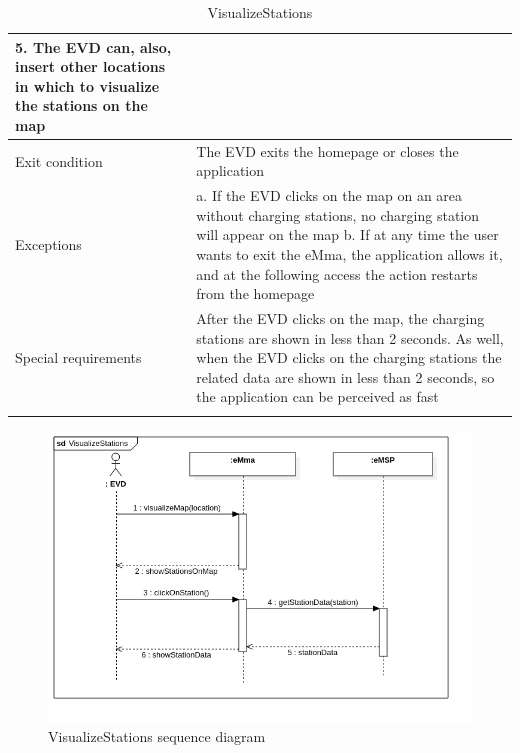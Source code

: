 \begin{center}
\begin{longtable}{p{4cm} p{11cm}}
                    5. The EVD can, also, insert other locations in which to visualize the stations on the map
     \\
     \hline
     Exit condition & The EVD exits the homepage or closes the application \\
     \hline
     Exceptions &   a. If the EVD clicks on the map on an area without charging stations, no charging station will appear on the map \newline
                    b. If at any time the user wants to exit the eMma, the application allows it, and at the following access the action restarts from the homepage \\
     \hline
     Special requirements & After the EVD clicks on the map, the charging stations are shown in less than 2 seconds. As well, when the EVD clicks on the charging stations the related data are shown in less than 2 seconds, so the application can be perceived as fast \\
     \hline
    \caption{VisualizeStations}
    \label{tab:VisualizeStations}
    \end{longtable}
\end{center}
\begin{figure}[H]
    \centering
    \includegraphics[width=1\textwidth]{Images/cp3/seqDiagrams/VisualizeStations.png}
    \caption{VisualizeStations sequence diagram}
\end{figure}

\clearpage
